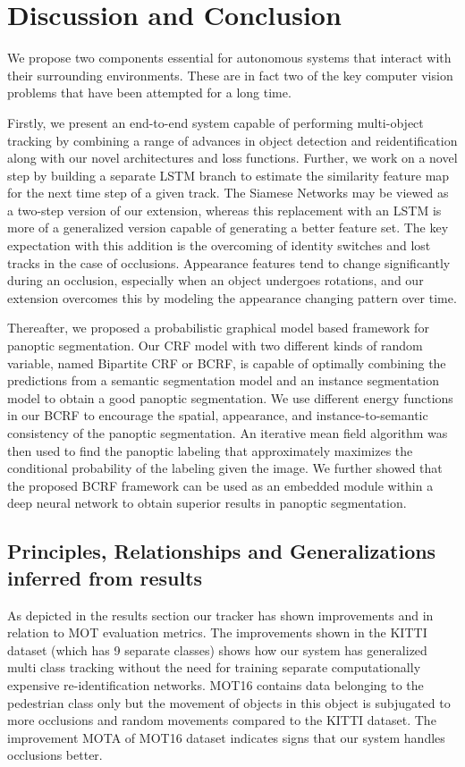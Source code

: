 \chapter{Discussion and Conclusion}

We propose two components essential for autonomous systems that interact with their surrounding environments. These are in fact two of the key computer vision problems that have been attempted for a long time. 

Firstly, we present an end-to-end system capable of performing multi-object tracking by combining a range of advances in object detection and reidentification along with our novel architectures and loss functions. Further, we work on a novel step by building a separate LSTM branch to estimate the similarity feature map for the next time step of a given track. The Siamese Networks may be viewed as a two-step version of our extension, whereas this replacement with an LSTM is more of a generalized version capable of generating a better feature set. The key expectation with this addition is the overcoming of identity switches and lost tracks in the case of occlusions. Appearance features tend to change significantly during an occlusion, especially when an object undergoes rotations, and our extension overcomes this by modeling the appearance changing pattern over time. 

Thereafter, we proposed a probabilistic graphical model based framework for panoptic segmentation. Our CRF model with two different kinds of random variable, named Bipartite CRF or BCRF, is capable of optimally combining the predictions from a semantic segmentation model and an instance segmentation model to obtain a good panoptic segmentation. We use different energy functions in our BCRF to encourage the spatial, appearance, and instance-to-semantic consistency of the panoptic segmentation. An iterative mean field algorithm was then used to find the panoptic labeling that approximately maximizes the conditional probability of the labeling given the image. We further showed that the proposed BCRF framework can be used as an embedded module within a deep neural network to obtain superior results in panoptic segmentation.

\section{Principles, Relationships and Generalizations inferred from results}
As depicted in the results section our tracker has shown improvements and in relation to MOT evaluation metrics. The improvements shown in the KITTI dataset (which has 9 separate classes) shows how our system has generalized multi class tracking without the need for training separate computationally expensive re-identification networks. MOT16 contains data belonging to the pedestrian class only but the movement of objects in this object is subjugated to more occlusions and random movements compared to the KITTI dataset. The improvement MOTA of MOT16 dataset indicates signs that our system handles occlusions better. 

